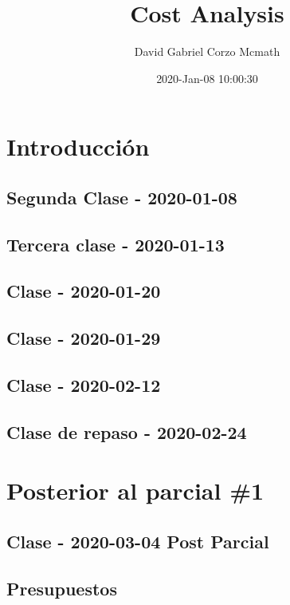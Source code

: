 \documentclass[openany]{book}
\title{Cost Analysis}
\author{David Gabriel Corzo Mcmath}
\date{2020-Jan-08 10:00:30}
\begin{document}
\maketitle
\tableofcontents

\part{Introducción} 
\chapter{Segunda Clase - 2020-01-08}


\chapter{Tercera clase - 2020-01-13}


\chapter{Clase - 2020-01-20}


\chapter{Clase - 2020-01-29}


\chapter{Clase - 2020-02-12}


\chapter{Clase de repaso - 2020-02-24}



\part{Posterior al parcial \#1} 

\chapter{Clase - 2020-03-04 Post Parcial}


\chapter{Presupuestos} %


\end{document}

